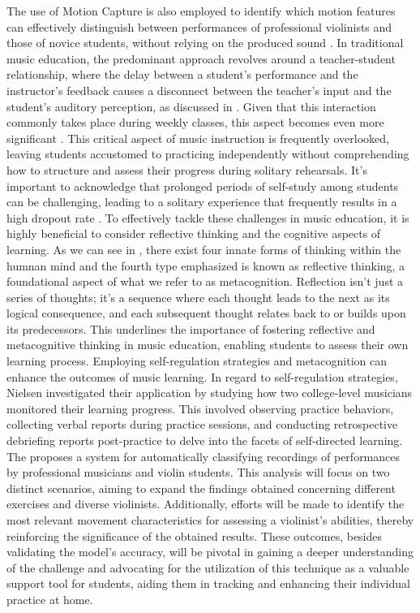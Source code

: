 The use of Motion Capture is also employed to identify which motion features can effectively distinguish between performances of professional violinists and those of novice students, without relying on the produced sound \cite{oneto:2020}. 
In traditional music education, the predominant approach revolves around a teacher-student relationship, where the delay between a student's performance and the instructor's feedback causes a disconnect between the teacher's input and the student's auditory perception, as discussed in \cite{violino:1985}.
Given that this interaction commonly takes place during weekly classes, this aspect becomes even more significant \cite{violino:1993}.
This critical aspect of music instruction is frequently overlooked, leaving students accustomed to practicing independently without comprehending how to structure and assess their progress during solitary rehearsals.
It's important to acknowledge that prolonged periods of self-study among students can be challenging, leading to a solitary experience that frequently results in a high dropout rate \cite{violino:2011}.
To effectively tackle these challenges in music education, it is highly beneficial to consider reflective thinking and the cognitive aspects of learning.
As we can see in \cite{violino:how_we_think}, there exist four innate forms of thinking within the humnan mind and the fourth type emphasized is known as reflective thinking, a foundational aspect of what we refer to as metacognition.
Reflection isn't just a series of thoughts; it's a sequence where each thought leads to the next as its logical consequence, and each subsequent thought relates back to or builds upon its predecessors.
This underlines the importance of fostering reflective and metacognitive thinking in music education, enabling students to assess their own learning process. Employing self-regulation strategies and metacognition can enhance the outcomes of music learning.
In regard to self-regulation strategies, Nielsen \cite{violino:nielsen} investigated their application by studying how two college-level musicians monitored their learning progress. This involved observing practice behaviors, collecting verbal reports during practice sessions, and conducting retrospective debriefing reports post-practice to delve into the facets of self-directed learning.
The \cite{oneto:2020} proposes a system for automatically classifying recordings of performances by professional musicians and violin students.
This analysis will focus on two distinct scenarios, aiming to expand the findings obtained concerning different exercises and diverse violinists.
Additionally, efforts will be made to identify the most relevant movement characteristics for assessing a violinist's abilities, thereby reinforcing the significance of the obtained results.
These outcomes, besides validating the model's accuracy, will be pivotal in gaining a deeper understanding of the challenge and advocating for the utilization of this technique as a valuable support tool for students, aiding them in tracking and enhancing their individual practice at home.

